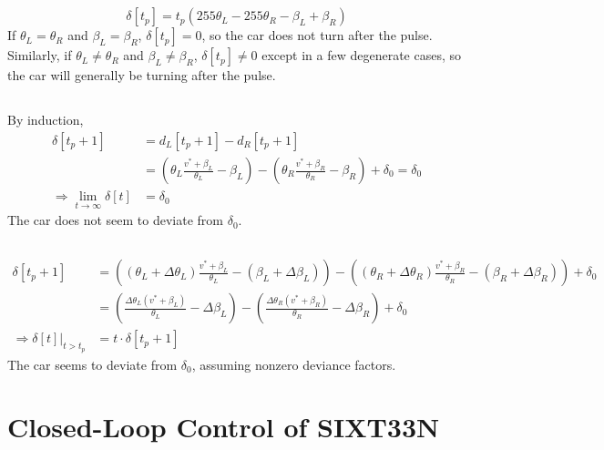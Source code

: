 \documentclass[]{article}
\begin{document}
\subsection{}

\begin{equation}
	\delta[t_p] = t_p(255\theta_L - 255\theta_R - \beta_L + \beta_R)
\end{equation}
If \(\theta_L = \theta_R\) and \(\beta_L = \beta_R\), \(\delta[t_p] = 0\), so the car does not turn after the pulse.
Similarly, if \(\theta_L \neq \theta_R\) and \(\beta_L \neq \beta_R\), \(\delta[t_p] \neq 0\) except in a few degenerate cases, so the car will generally be turning after the pulse.

\subsection{}

By induction,
\begin{align}
	\delta[t_p + 1] &= d_L[t_p + 1] - d_R[t_p + 1] \\
	&= \left(\theta_L \frac{v^\ast + \beta_L}{\theta_L} - \beta_L\right) - \left(\theta_R \frac{v^\ast + \beta_R}{\theta_R} - \beta_R\right) + \delta_0 = \delta_0 \\
	\Rightarrow \lim_{t \to \infty} \delta[t] &= \delta_0
\end{align}
The car does not seem to deviate from \(\delta_0\).

\subsection{}

\begin{align}
	\delta[t_p + 1] &= \left((\theta_L + \Delta \theta_L) \frac{v^\ast + \beta_L}{\theta_L} - (\beta_L + \Delta \beta_L)\right) - \left((\theta_R + \Delta \theta_R) \frac{v^\ast + \beta_R}{\theta_R} - (\beta_R + \Delta \beta_R)\right) + \delta_0 \\
	&= \left(\frac{\Delta \theta_L (v^\ast + \beta_L)}{\theta_L} - \Delta \beta_L\right) - \left(\frac{\Delta \theta_R (v^\ast + \beta_R)}{\theta_R} - \Delta \beta_R\right) + \delta_0 \\
	\Rightarrow \delta[t]|_{t > t_p} &= t \cdot \delta[t_p + 1]
\end{align}
The car seems to deviate from \(\delta_0\), assuming nonzero deviance factors.

\section{Closed-Loop Control of SIXT33N}
\end{document}
